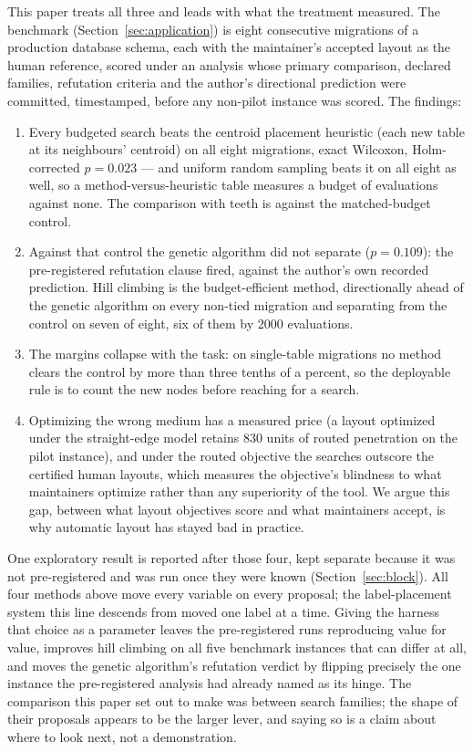 \documentclass[11pt]{article}
\begin{document}
This paper treats all three and leads with what the treatment measured. The benchmark
(Section~\ref{sec:application}) is eight consecutive migrations of a production database
schema, each with the maintainer's accepted layout as the human reference, scored under an
analysis whose primary comparison, declared families, refutation criteria and the author's
directional prediction were committed, timestamped, before any non-pilot instance was
scored. The findings:
\begin{enumerate}
\item Every budgeted search beats the centroid placement heuristic (each new table at its
  neighbours' centroid) on all eight migrations, exact Wilcoxon, Holm-corrected
  $p = 0.023$ --- and uniform random sampling beats it on all eight as well, so a
  method-versus-heuristic table measures a budget of evaluations against none. The
  comparison with teeth is against the matched-budget control.
\item Against that control the genetic algorithm did not separate ($p = 0.109$): the
  pre-registered refutation clause fired, against the author's own recorded prediction.
  Hill climbing is the budget-efficient method, directionally ahead of the genetic
  algorithm on every non-tied migration and separating from the control on seven of eight,
  six of them by 2000 evaluations.
\item The margins collapse with the task: on single-table migrations no method clears the
  control by more than three tenths of a percent, so the deployable rule is to count the
  new nodes before reaching for a search.
\item Optimizing the wrong medium has a measured price (a layout optimized under the
  straight-edge model retains 830 units of routed penetration on the pilot instance), and
  under the routed objective the searches outscore the certified human layouts, which
  measures the objective's blindness to what maintainers optimize rather than any
  superiority of the tool. We argue this gap, between what layout objectives score and
  what maintainers accept, is why automatic layout has stayed bad in practice.
\end{enumerate}

One exploratory result is reported after those four, kept separate because it was not
pre-registered and was run once they were known (Section~\ref{sec:block}). All four methods
above move every variable on every proposal; the label-placement system this line descends
from moved one label at a time. Giving the harness that choice as a parameter leaves the
pre-registered runs reproducing value for value, improves hill climbing on all five benchmark
instances that can differ at all, and moves the genetic algorithm's refutation verdict by
flipping precisely the one instance the pre-registered analysis had already named as its
hinge. The comparison this paper set out to make was between search families; the shape of
their proposals appears to be the larger lever, and saying so is a claim about where to look
next, not a demonstration.
\end{document}
